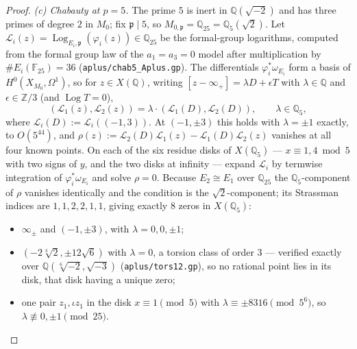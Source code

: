 \documentclass[11pt,reqno]{amsart}
\theoremstyle{plain}
\theoremstyle{definition}
\newcommand{\Q}{\mathbb{Q}}
\newcommand{\Z}{\mathbb{Z}}
\newcommand{\FF}{\mathbb{F}}
\newcommand{\pp}{\mathfrak{p}}
\DeclareMathOperator{\Log}{Log}
\numberwithin{equation}{section}
\begin{document}
\begin{proof}
\emph{(c) Chabauty at $p=5$.} The prime $5$ is inert in $\Q(\sqrt{-2})$ and has
three primes of degree $2$ in $M_{0}$; fix $\pp\mid5$, so
$M_{0,\pp}=\Q_{25}=\Q_{5}(\sqrt2)$. Let
$\mathcal{L}_{i}(z)=\Log_{E_{i},\pp}(\varphi_{i}(z))\in\Q_{25}$ be the
formal-group logarithms, computed from the formal group law of the
$a_{1}=a_{3}=0$ model after multiplication by $\#E_{i}(\FF_{25})=36$
(\texttt{aplus/chab5\_Aplus.gp}). The differentials
$\varphi_{i}^{*}\omega_{E_{i}}$ form a basis of $H^{0}(X_{M_{0}},\Omega^{1})$,
so for $z\in X(\Q)$, writing $[z-\infty_{+}]=\lambda D+\epsilon T$ with
$\lambda\in\Q$ and $\epsilon\in\Z/3$ (and $\Log T=0$),
\[
  (\mathcal{L}_{1}(z),\mathcal{L}_{2}(z))
   =\lambda\cdot(\mathcal{L}_{1}(D),\mathcal{L}_{2}(D)),\qquad \lambda\in\Q_{5},
\]
where $\mathcal{L}_{i}(D):=\mathcal{L}_{i}((-1,3))$. At $(-1,\pm3)$ this holds
with $\lambda=\pm1$ exactly, to $O(5^{44})$, and
$\rho(z):=\mathcal{L}_{2}(D)\mathcal{L}_{1}(z)-\mathcal{L}_{1}(D)\mathcal{L}_{2}(z)$
vanishes at all four known points. On each of the six residue disks of
$X(\Q_{5})$ --- $x\equiv1,4 \bmod 5$ with two signs of $y$, and the two disks at
infinity --- expand $\mathcal{L}_{i}$ by termwise integration of
$\varphi_{i}^{*}\omega_{E_{i}}$ and solve $\rho=0$. Because $E_{2}\cong E_{1}$
over $\Q_{25}$ the $\Q_{5}$-component of $\rho$ vanishes identically and the
condition is the $\sqrt2$-component; its Strassman indices are $1,1,2,2,1,1$,
giving exactly $8$ zeros in $X(\Q_{5})$:
\begin{itemize}[leftmargin=2.4em]
\item $\infty_{\pm}$ and $(-1,\pm3)$, with $\lambda=0,0,\pm1$;
\item $(-2\sqrt[3]{2},\pm12\sqrt6)$ with $\lambda=0$, a torsion class of order
      $3$ --- verified exactly over $\Q(\sqrt[6]{-2},\sqrt{-3})$
      (\texttt{aplus/tors12.gp}), so no rational point lies in its disk, that
      disk having a unique zero;
\item one pair $z_{1},\iota z_{1}$ in the disk $x\equiv1\pmod5$ with
      $\lambda\equiv\pm8316\pmod{5^{6}}$, so $\lambda\not\equiv0,\pm1\pmod{25}$.
\end{itemize}


\end{proof}
\end{document}
